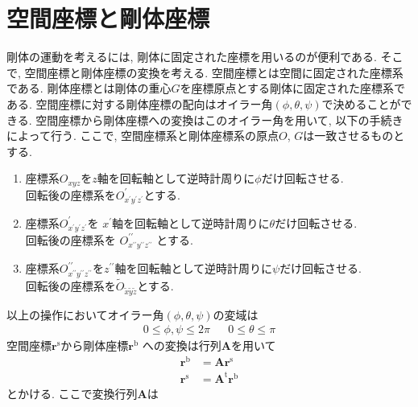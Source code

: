\section{空間座標と剛体座標}
剛体の運動を考えるには, 剛体に固定された座標を用いるのが便利である. 
そこで, 空間座標と剛体座標の変換を考える. 
空間座標とは空間に固定された座標系である. 
剛体座標とは剛体の重心$G$を座標原点とする剛体に固定された座標系である. 
空間座標に対する剛体座標の配向はオイラー角$(\phi,\theta,\psi)$で決めることができる. 
空間座標から剛体座標への変換はこのオイラー角を用いて, 以下の手続きによって行う. 
ここで, 空間座標系と剛体座標系の原点$O$, $G$は一致させるものとする. 
\begin{enumerate}
 \item 座標系$O_{xyz}$を$z$軸を回転軸として逆時計周りに$\phi$だけ回転させる. 
       \\回転後の座標系を$O^{\prime}_{x^{\prime}y^{\prime}z^{\prime}}$とする. 
 \item 座標系$O^{\prime}_{x^{\prime}y^{\prime}z^{\prime}}$を
       $x^{\prime}$軸を回転軸として逆時計周りに$\theta$だけ回転させる. 
       \\回転後の座標系を
       $O^{\prime \prime}_{x^{\prime \prime} y^{\prime \prime} z^{\prime \prime}}$
       とする.

 \item 座標系$O^{\prime \prime}_{x^{\prime \prime} y^{\prime \prime} z^{\prime \prime}}$を$z^{\prime \prime}$軸を回転軸として逆時計周りに$\psi$だけ回転させる. 
       \\回転後の座標系を$\tilde{O}_{\tilde{x} \tilde{y} \tilde{z}}$とする. 
\end{enumerate}
以上の操作においてオイラー角$(\phi,\theta,\psi)$の変域は
\begin{align}
 0 \leq \phi,\psi \leq 2\pi && 0 \leq \theta \leq \pi
 \label{eq:RigidBodyMD1}
\end{align}
空間座標$\bm{r}^{\mathrm{s}}$から剛体座標$\bm{r}^{\mathrm{b}}$
への変換は行列$\bm{A}$を用いて
\begin{align}
 \bm{r}^{\mathrm{b}} &= \bm{A} \bm{r}^{\mathrm{s}}
 \label{eq:RigidBodyMD2}
 \\
 \bm{r}^{\mathrm{s}} &= \bm{A}^{\mathrm{t}} \bm{r}^{\mathrm{b}}
 \label{eq:RigidBodyMD3}
\end{align}
とかける. ここで変換行列$\bm{A}$は
